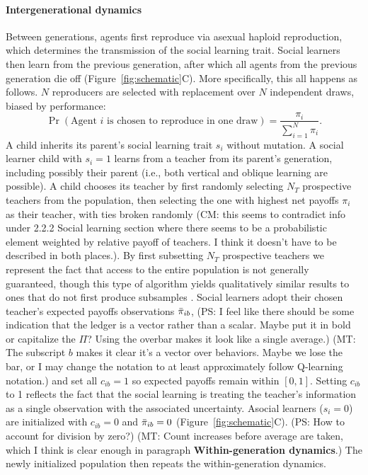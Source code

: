 \documentclass[letterpaper,11.5pt]{scrartcl}
\newcommand{\mt}[1]{{\textcolor{myorange} {({\tiny MT:} #1)}}}
\newcommand{\cm}[1]{{\textcolor{mypurple} {({\tiny CM:} #1)}}}
\newcommand{\ps}[1]{{\textcolor{mygreen} {({\tiny PS:} #1)}}}
\begin{document}
\paragraph{Intergenerational dynamics}
Between generations, agents first reproduce via asexual haploid reproduction, which determines the transmission of the social learning trait. Social learners then learn from the
previous generation, after which all agents from the
previous generation die off (Figure~\ref{fig:schematic}C). More specifically, this all happens as follows. 
$N$ reproducers are selected with replacement over $N$ independent draws, 
biased by performance:
\begin{equation}
  \Pr(\text{Agent $i$ is chosen to reproduce in one draw}) = \frac{\pi_i}{\sum_{i=1}^N \pi_i}.
\end{equation}
\noindent
A child inherits its parent's social learning trait $s_i$ without mutation.
A social learner child with $s_i = 1$ learns from a teacher from its parent's
generation, including possibly their parent (i.e., both vertical and oblique learning are possible). 
A child chooses its teacher by first randomly selecting $N_T$ prospective
teachers from the population, then selecting the one with
highest net payoffs $\pi_i$ as their teacher, with ties broken randomly \cm{this seems to contradict info under 2.2.2 Social learning section where there seems to be a probabilistic element weighted by relative payoff of teachers. I think it doesn't have to be described in both places.}. By first subsetting $N_T$ prospective teachers we represent the fact that access to the entire population is not generally guaranteed, though this type of algorithm yields qualitatively similar results to ones that do not first produce subsamples \cite{smaldino2019open}. 
Social learners adopt their chosen teacher's expected payoffs observations $\bar\pi_{ib}$, \ps{I feel
like there should be some indication that the ledger is a vector rather than a scalar. Maybe put
it in bold or capitalize the $\Pi$? Using the overbar makes it look like a single average.}
\mt{The subscript $b$ makes it clear it's a vector over behaviors. Maybe we lose the bar,
or I may change the notation to at least approximately follow Q-learning notation.}
and set all $c_{ib} = 1$ so expected payoffs remain within $[0, 1]$. Setting $c_{ib}$ to 1 reflects the fact that the social learning is treating the teacher's information as a single observation with the associated uncertainty.   Asocial
learners ($s_i = 0$) are initialized with $c_{ib} = 0$ and $\bar\pi_{ib} = 0$ 
(Figure~\ref{fig:schematic}C). \ps{How to account for division by zero?} \mt{Count increases
before average are taken, which I think is clear enough in paragraph \textbf{Within-generation
dynamics}.} The
newly initialized population then repeats the within-generation dynamics. 
\end{document}
